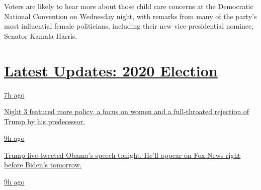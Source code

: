 Voters are likely to hear more about those child care concerns at the
Democratic National Convention on Wednesday night, with remarks from
many of the party's most influential female politicians, including their
new vice-presidential nominee, Senator Kamala Harris.

\hypertarget{latest-updates-2020-election}{%
\section{\texorpdfstring{\href{https://www.nytimes3xbfgragh.onion/live/2020/08/19/us/dnc-convention-election?action=click\&pgtype=Article\&state=default\&region=MAIN_CONTENT_1\&context=storylines_live_updates}{Latest
Updates: 2020
Election}}{Latest Updates: 2020 Election}}\label{latest-updates-2020-election}}

\href{https://www.nytimes3xbfgragh.onion/live/2020/08/19/us/dnc-convention-election?action=click\&pgtype=Article\&state=default\&region=MAIN_CONTENT_1\&context=storylines_live_updates\#night-3-featured-more-policy-a-focus-on-women-and-a-full-throated-rejection-of-trump-by-his-predecessor}{7h
ago}

\href{https://www.nytimes3xbfgragh.onion/live/2020/08/19/us/dnc-convention-election?action=click\&pgtype=Article\&state=default\&region=MAIN_CONTENT_1\&context=storylines_live_updates\#night-3-featured-more-policy-a-focus-on-women-and-a-full-throated-rejection-of-trump-by-his-predecessor}{Night
3 featured more policy, a focus on women and a full-throated rejection
of Trump by his predecessor.}

\href{https://www.nytimes3xbfgragh.onion/live/2020/08/19/us/dnc-convention-election?action=click\&pgtype=Article\&state=default\&region=MAIN_CONTENT_1\&context=storylines_live_updates\#trump-live-tweeted-obamas-speech-tonight-hell-appear-on-fox-news-right-before-bidens-tomorrow}{9h
ago}

\href{https://www.nytimes3xbfgragh.onion/live/2020/08/19/us/dnc-convention-election?action=click\&pgtype=Article\&state=default\&region=MAIN_CONTENT_1\&context=storylines_live_updates\#trump-live-tweeted-obamas-speech-tonight-hell-appear-on-fox-news-right-before-bidens-tomorrow}{Trump
live-tweeted Obama's speech tonight. He'll appear on Fox News right
before Biden's tomorrow.}

\href{https://www.nytimes3xbfgragh.onion/live/2020/08/19/us/dnc-convention-election?action=click\&pgtype=Article\&state=default\&region=MAIN_CONTENT_1\&context=storylines_live_updates\#advocates-for-domestic-violence-survivors-praised-biden-in-a-video}{9h
ago}

